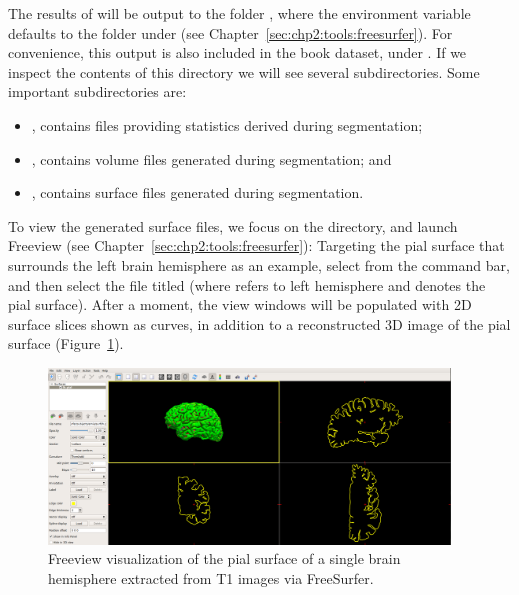 The results of  will be output to the folder
, where the environment variable
 defaults to the  folder under
 (see
Chapter~\ref{sec:chp2:tools:freesurfer}). For convenience, this output
is also included in the book dataset, under \emp{\ernieoutput}. If we
inspect the contents of this directory we will see several
subdirectories. Some important subdirectories are:
\begin{itemize}
\item {}, contains files providing statistics derived during segmentation;
\item {}, contains volume files generated during segmentation; and
\item {}, contains surface files generated during segmentation.
\end{itemize}

%
%
To view the generated surface files, we focus on the 
directory, and launch Freeview (see
Chapter~\ref{sec:chp2:tools:freesurfer}):
\noindent Targeting the pial surface that surrounds the left brain
hemisphere as an example, select 
from the command bar, and then select the file titled 
(where  refers to left hemisphere and  denotes the pial
surface). After a moment, the view windows will be populated with 2D
surface slices shown as curves, in addition to a reconstructed 3D
image of the pial surface (Figure~\ref{fig:chp3:freeview-scr}).
\begin{figure}
  \centering
  \includegraphics[width=0.95\textwidth]{./graphics/chp3/freeviewexscr}
  \caption{Freeview visualization of the pial surface of a single
    brain hemisphere extracted from T1 images via FreeSurfer.}
  \label{fig:chp3:freeview-scr}
\end{figure}

